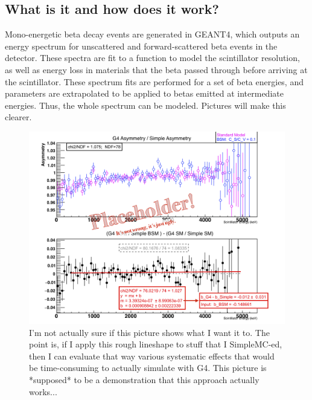 	\subsection{What is it and how does it work?}
	Mono-energetic beta decay events are generated in GEANT4, which outputs an energy spectrum for unscattered and forward-scattered beta events in the detector.  These spectra are fit to a function to model the scintillator resolution, as well as energy loss in materials that the beta passed through before arriving at the scintillator.  These spectrum fits are performed for a set of beta energies, and parameters are extrapolated to be applied to betas emitted at intermediate energies.  Thus, the whole spectrum can be modeled.  Pictures will make this clearer. 
	
    \begin{figure}[h!!!t]
    	\centering
    	\includegraphics[width=.999\linewidth]
    	{Figures/LineshapeDemo_prelim.png}
    	\caption[Lineshape Comparison]{I'm not actually sure if this picture shows what I want it to.  The point is, if I apply this rough lineshape to stuff that I SimpleMC-ed, then I can evaluate that way various systematic effects that would be time-consuming to actually simulate with G4.  This picture is  *supposed* to be a demonstration that this approach actually works... }    	\label{fig:lineshape_demo}
    \end{figure}
	
	
